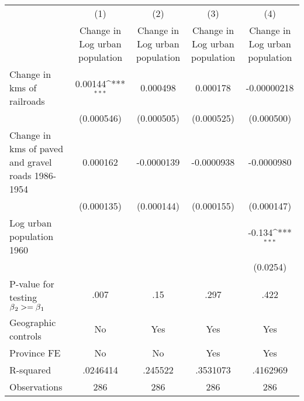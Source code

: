 {
\def\sym#1{\ifmmode^{#1}\else\(^{#1}\)\fi}
\begin{tabular}{l*{4}{c}}
\hline\hline
                &\multicolumn{1}{c}{(1)}&\multicolumn{1}{c}{(2)}&\multicolumn{1}{c}{(3)}&\multicolumn{1}{c}{(4)}\\
                &\multicolumn{1}{c}{Change in Log urban population}&\multicolumn{1}{c}{Change in Log urban population}&\multicolumn{1}{c}{Change in Log urban population}&\multicolumn{1}{c}{Change in Log urban population}\\
\hline
Change in kms of railroads&  0.00144\sym{***}& 0.000498         & 0.000178         &-0.00000218         \\
                &(0.000546)         &(0.000505)         &(0.000525)         &(0.000500)         \\
[1em]
Change in kms of paved and gravel roads 1986-1954& 0.000162         &-0.0000139         &-0.0000938         &-0.0000980         \\
                &(0.000135)         &(0.000144)         &(0.000155)         &(0.000147)         \\
[1em]
Log urban population 1960&                  &                  &                  &   -0.134\sym{***}\\
                &                  &                  &                  & (0.0254)         \\
\hline
P-value for testing $\beta\\_2 >= \beta\\_1$&     .007         &      .15         &     .297         &     .422         \\
Geographic controls&       No         &      Yes         &      Yes         &      Yes         \\
Province FE     &       No         &       No         &      Yes         &      Yes         \\
R-squared       & .0246414         &  .245522         & .3531073         & .4162969         \\
Observations    &      286         &      286         &      286         &      286         \\
\hline\hline
\end{tabular}
}

